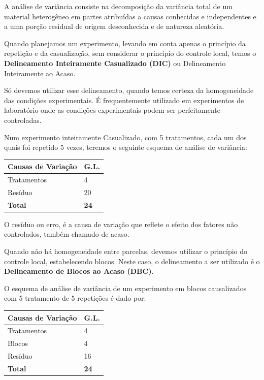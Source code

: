 \documentclass[
]{book}
\begin{document}
A análise de variância consiste na decomposição da variância total de um material heterogêneo em partes atribuídas a causas conhecidas e independentes e a uma porção residual de origem desconhecida e de natureza aleatória.

Quando planejamos um experimento, levando em conta apenas o princípio da repetição e da casualização, sem considerar o princípio do controle local, temos o \textbf{Delineamento Inteiramente Casualizado (DIC)} ou Delineamento Inteiramente ao Acaso.

Só devemos utilizar esse delineamento, quando temos certeza da homogeneidade das condições experimentais. É frequentemente utilizado em experimentos de laboratório onde as condições experimentais podem ser perfeitamente controladas.

Num experimento inteiramente Casualizado, com 5 tratamentos, cada um dos quais foi repetido 5 vezes, teremos o seguinte esquema de análise de variância:

\begin{table}[H]
\centering
\begin{tabular}{l|l}
\hline
Causas de Variação & G.L.\\
\hline
Tratamentos & 4\\
\hline
Resíduo & 20\\
\hline
\textbf{Total} & \textbf{24}\\
\hline
\end{tabular}
\end{table}

O resíduo ou erro, é a causa de variação que reflete o efeito dos fatores não controlados, também chamado de acaso.

Quando não há homogeneidade entre parcelas, devemos utilizar o princípio do controle local, estabelecendo blocos. Neste caso, o delineamento a ser utilizado é o \textbf{Delineamento de Blocos ao Acaso (DBC)}.

O esquema de análise de variância de um experimento em blocos causalizados com 5 tratamento de 5 repetições é dado por:

\begin{table}[H]
\centering
\begin{tabular}{l|l}
\hline
Causas de Variação & G.L.\\
\hline
Tratamentos & 4\\
\hline
Blocos & 4\\
\hline
Resíduo & 16\\
\hline
\textbf{Total} & \textbf{24}\\
\hline
\end{tabular}
\end{table}
\end{document}
